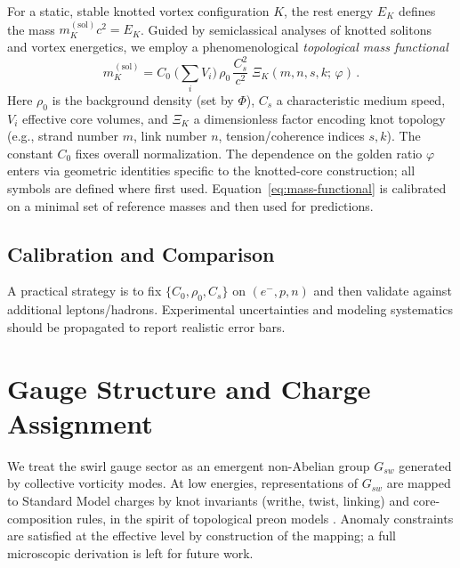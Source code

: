 \documentclass[12pt]{article}
\begin{document}
    For a static, stable knotted vortex configuration $K$, the rest energy $E_K$ defines the mass $m_K^{(\mathrm{sol})} c^2 = E_K$. Guided by semiclassical analyses of knotted solitons \cite{Faddeev1997} and vortex energetics, we employ a phenomenological \emph{topological mass functional}
    \begin{equation}
        m_K^{(\mathrm{sol})}
        = C_0\; \Big(\sum_i V_i\Big)\, \rho_0\, \frac{C_s^2}{c^2}\; \Xi_K(m,n,s,k;\,\varphi)\,.
        \label{eq:mass-functional}
    \end{equation}
    Here $\rho_0$ is the background density (set by $\Phi$), $C_s$ a characteristic medium speed, $V_i$ effective core volumes, and $\Xi_K$ a dimensionless factor encoding knot topology (e.g., strand number $m$, link number $n$, tension/coherence indices $s,k$). The constant $C_0$ fixes overall normalization. The dependence on the golden ratio $\varphi$ enters via geometric identities specific to the knotted-core construction; all symbols are defined where first used. Equation~\eqref{eq:mass-functional} is calibrated on a minimal set of reference masses and then used for predictions.

    \subsection{Calibration and Comparison}
    A practical strategy is to fix $\{C_0,\rho_0, C_s\}$ on $(e^-,p,n)$ and then validate against additional leptons/hadrons. Experimental uncertainties and modeling systematics should be propagated to report realistic error bars.

    \section{Gauge Structure and Charge Assignment}

    We treat the swirl gauge sector as an emergent non-Abelian group $G_{\!sw}$ generated by collective vorticity modes. At low energies, representations of $G_{\!sw}$ are mapped to Standard Model charges by knot invariants (writhe, twist, linking) and core-composition rules, in the spirit of topological preon models \cite{BilsonThompson2007}. Anomaly constraints are satisfied at the effective level by construction of the mapping; a full microscopic derivation is left for future work.
\end{document}
